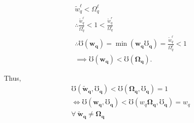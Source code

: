 \documentclass[hidelinks, nonatbib]{elsarticle}
\begin{document}
\begin{enumerate}
    \begin{align}
        &
        \tilde{w}_{q}^{\ell} < \Omega_{q}^{\ell}
        \\
        &\therefore
        \frac{
            \tilde{w}_{q}^{\ell}
        }{
            \Omega_{q}^{\ell}
        }
        < 
        1
        < 
        \frac{
            \tilde{w}_{q}^{r}
        }{
            \Omega_{q}^{r}
        }
        \\
        &\therefore
        \mho(\boldsymbol{w_q})
        = 
        \min(
            \boldsymbol{w_q}
            \boldsymbol{\mho_q}
        )
        =
        \frac{
            \tilde{w}_{q}^{\ell}
        }{
            \Omega_{q}^{\ell}
        }
        < 
        1
        \\
        &\implies
        \mho(\boldsymbol{w_q})
        <
        \mho(\boldsymbol{\Omega_q})
        .
    \end{align}

    Thus, 
    \begin{align}
        &
        \mho(
            \boldsymbol{\tilde{w}_{q}},
            \boldsymbol{\mho_q}
        ) < 
        \mho(
            \boldsymbol{\Omega_{q}},
            \boldsymbol{\mho_q}
        ) 
        = 1
        \\
        &\iff
        \mho(
            \boldsymbol{w_{q}},
            \boldsymbol{\mho_q}
        ) < 
        \mho(
            w_{q}
            \boldsymbol{\Omega_{q}},
            \boldsymbol{\mho_q}
        ) 
        = w_q
        \\
        &
        \forall
        \
        \boldsymbol{\tilde{w}_{q}}
        \neq
        \boldsymbol{\Omega_{q}}
    \end{align}


\end{enumerate}
\end{document}
